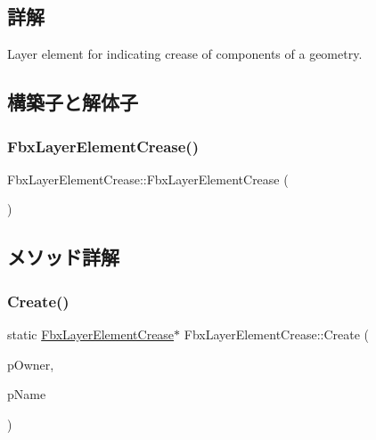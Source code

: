 \subsection{詳解}
Layer element for indicating crease of components of a geometry. 

\subsection{構築子と解体子}
\mbox{\label{class_fbx_layer_element_crease_a7dc7dd72a8045344bd1502dcc4fbf728}} 
\subsubsection{\texorpdfstring{Fbx\+Layer\+Element\+Crease()}{FbxLayerElementCrease()}}
{\footnotesize\ttfamily Fbx\+Layer\+Element\+Crease\+::\+Fbx\+Layer\+Element\+Crease (\begin{DoxyParamCaption}{ }\end{DoxyParamCaption})\hspace{0.3cm}{\ttfamily [protected]}}



\subsection{メソッド詳解}
\mbox{\label{class_fbx_layer_element_crease_a658cc8d2e86ed9c86663e6afc72d229c}} 
\subsubsection{\texorpdfstring{Create()}{Create()}}
{\footnotesize\ttfamily static \hyperlink{class_fbx_layer_element_crease}{Fbx\+Layer\+Element\+Crease}$\ast$ Fbx\+Layer\+Element\+Crease\+::\+Create (\begin{DoxyParamCaption}\item[{\hyperlink{class_fbx_layer_container}{Fbx\+Layer\+Container} $\ast$}]{p\+Owner,  }\item[{const char $\ast$}]{p\+Name }\end{DoxyParamCaption})\hspace{0.3cm}{\ttfamily [static]}}

